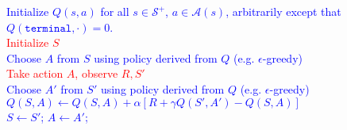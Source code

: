 \documentclass{standalone}
\begin{document}
\pagestyle{empty}
\begin{algorithm}[H]
  \textcolor{blue}{Initialize $Q(s,a)$ for all $s \in \mathcal S^+$, $a \in \mathcal A(s)$,   arbitrarily except that $Q(\texttt{terminal}, \cdot) = 0$.\\}
 {
  \textcolor{red}{Initialize $S$} \\
  \textcolor{blue}{Choose $A$ from $S$ using policy derived from $Q$ (e.g. $\epsilon$-greedy)} \\
   {
    \textcolor{red}{Take action $A$, observe $R, S'$ \\}
    \textcolor{blue}{Choose $A'$ from $S'$ using policy derived from $Q$ (e.g. $\epsilon$-greedy)         \\
    $Q(S, A) \gets Q(S, A) + \alpha \left[R + \gamma Q(S', A') - Q(S, A)\right]$     \\
    $S \gets S'$; $A \gets A'$;}
  }
}
\end{algorithm}
\end{document}
